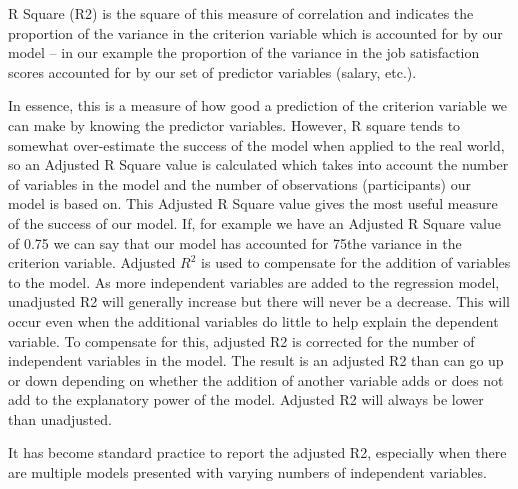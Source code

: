\documentclass[a4paper,12pt]{article}
\begin{document}
R Square (R2) is the square of this measure of
correlation and indicates the proportion of the variance in the criterion variable which is accounted for by our model – in our example the proportion of the
variance in the job satisfaction scores accounted for by our set of predictor variables
(salary, etc.).

In essence, this is a measure of how good a prediction of the criterion variable we can make by knowing the predictor variables.
However, R square tends to somewhat over-estimate the success of the model when applied to the real world, so an Adjusted R Square value is calculated which takes into account the number of variables in the model and the number of observations (participants) our model is based on. This Adjusted R Square value gives the most useful measure of the success of our model. If, for example we have an Adjusted R Square value of 0.75 we can say that our model has accounted for 75\of the variance in the criterion
variable.
%
Adjusted $R^2$ is used to compensate for the addition of variables to the model.  As more independent variables are added to the regression model, unadjusted R2 will generally increase but there will never be a decrease.  This will occur even when the additional variables do little to help explain the dependent variable.  To compensate for this, adjusted R2 is corrected for the number of independent variables in the model.  The result is an adjusted R2 than can go up or down depending on whether the addition of another variable adds or does not add to the explanatory power of the model.  Adjusted R2 will always be lower than unadjusted.

It has become standard practice to report the adjusted R2, especially when there are multiple models presented with varying numbers of independent variables.
\end{document}
